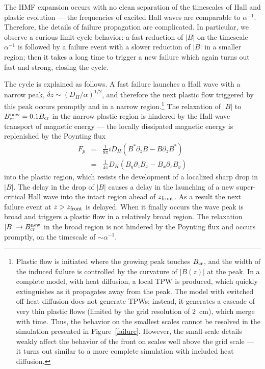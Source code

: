 The HMF expansion occurs with 
no clean separation of the timescales of Hall and 
plastic evolution --- the frequencies of excited Hall waves are comparable to $\alpha^{-1}$.
Therefore, the details of failure propagation are complicated. In particular, we 
observe a curious limit-cycle behavior:
a fast reduction of $|B|$ on the timescale $\alpha^{-1}$ is followed by a failure
event with a slower reduction of $|B|$ in a smaller region; then it takes a long 
time to trigger a new failure which again turns out fast and strong, closing the cycle.

The cycle is explained as follows. A fast failure launches a Hall wave with
a narrow peak, $\delta z\sim (D_H/\alpha)^{1/2}$, and therefore the next plastic 
flow triggered by this peak occurs promptly and in a narrow region.\footnote{Plastic 
     flow is initiated where the growing peak touches $B_{\rm cr}$, and the width of the induced 
     failure is controlled by the curvature of $|B(z)|$ at the peak.
     In a complete model, with heat diffusion,
     a local TPW is produced, which quickly extinguishes as it propagates
     away from the peak. The model with switched off heat diffusion does not generate TPWs; 
     instead, it generates a cascade of very thin plastic flows (limited by the grid resolution of
     $2$~cm), which merge with time. Thus, the behavior on the smallest scales cannot be 
     resolved in the simulation presented in Figure~\ref{failure}. However, the small-scale details weakly 
     affect the behavior
     of the front on scales well above the grid scale --- it turns out similar to 
     a more complete simulation with included heat diffusion.
     }    
The relaxation of $|B|$ to $B_{\rm cr}^{\rm new}=0.1B_{\rm cr}$ in the narrow plastic region
is hindered by the Hall-wave transport of magnetic energy
--- the locally dissipated magnetic energy is replenished 
by the Poynting flux 
\begin{eqnarray}
F_p&=&\frac{1}{8\pi} i D_H(B^*\partial_z B-B\partial_z B^*) \nonumber\\
 &=&\frac{1}{4\pi}D_H(B_y\partial_z B_x-B_x\partial_z B_y)
\end{eqnarray}
into the plastic region, which resists the development of a localized
sharp drop in $|B|$.
The delay in the drop of $|B|$ causes a delay in the launching of a new super-critical 
Hall wave into the intact region ahead of $z_{\rm front}$.
As a result the next failure event at $z>z_{\rm front}$ is 
delayed. When it finally occurs the wave peak is broad and triggers a plastic flow in a 
relatively broad region.  The relaxation $|B|\rightarrow B_{\rm cr}^{\rm new}$ in the broad 
region is not hindered by the Poynting flux and occurs promptly, on the timescale of 
$\sim \alpha^{-1}$.

